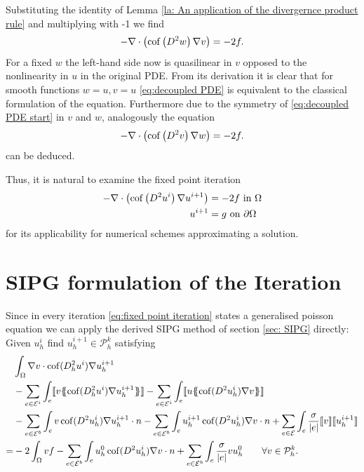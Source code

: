 Substituting the identity of Lemma \ref{la: An application of the divergernce product rule} and multiplying with -1 we find
\begin{align}
	- \nabla \cdot \left( \operatorname{cof} \left(  D^2 w \right) \nabla v \right)  = -2f.  \label{eq:decoupled PDE}
\end{align}
For a fixed $w$ the left-hand side now is quasilinear in $v$ opposed to the nonlinearity in $u$ in the original PDE. From its derivation it is clear that for smooth functions $w=u, v=u$ \eqref{eq:decoupled PDE} is equivalent to the classical formulation of the \MA equation. Furthermore due to the symmetry of \eqref{eq:decoupled PDE start} in $v$ and $w$, analogously the equation 
\begin{align}
	- \nabla \cdot \left( \operatorname{cof} \left(  D^2 v \right) \nabla w \right)  = -2f.  \label{eq:decoupled PDE two}
\end{align}
can be deduced.

Thus, it is natural to examine the fixed point iteration
\begin{align}
	\begin{split}
	- \nabla \cdot \left( \operatorname{cof} \left(  D^2 u^i \right) \nabla u^{i+1} \right)  &= -2f  \text{ in } \Omega \\
		u^{i+1} &= g \textnormal{ on } \partial \Omega
	\label{eq:fixed point iteration}
	\end{split}
\end{align}
for its applicability for numerical schemes approximating a \MA solution.

\section{SIPG formulation of the Iteration}\label{sec: SIPG MA}
Since in every iteration \eqref{eq:fixed point iteration} states a generalised poisson equation we can apply the derived  SIPG method of section \ref{sec: SIPG} directly: Given $u^i_h$ find $u^{i+1}_h \in \mathcal P^k_h$ satisfying
\begin{align}
 &\int_{\Omega} \nabla v \cdot \cof(D_h^2 u^{i}) \nabla u_h^{i+1}\\
 & -\sum\limits_{e \in \bigEps^i}\int_{e} \jump {v \average { \cof(D_h^2 u^{i}) \nabla u_h^{i+1}} }
 - \sum\limits_{e \in \bigEps^i}\int_{e} \jump {u \average{ \cof(D^2 u_h^{i}) \nabla v} } \\  
 & - \sum\limits_{e \in \bigEps^b}\int_{e} v \cof(D^2 u_h^{i}) \nabla u_h^{i+1}\cdot n 
    - \sum\limits_{e \in \bigEps^b}\int_{e} u_h^{i+1}\cof(D^2 u_h^{i}) \nabla v \cdot n
    +\sum\limits_{e \in \bigEps} \int_e \frac \sigma {|e|} \jump v  \jump {u_h^{i+1}}\\
    =& - 2 \int_{\Omega}v f
    	 				-\sum\limits_{e \in \bigEps^b}\int_{e} u_h^0 \cof(D^2 u_h^{i}) \nabla v \cdot n 
    	 				+\sum\limits_{e \in \bigEps^b} \int_e \frac \sigma {|e|} v u_h^0    \qquad \forall v \in  \mathcal P^k_h.
    	\label{eq: sipg iteration}
\end{align}

